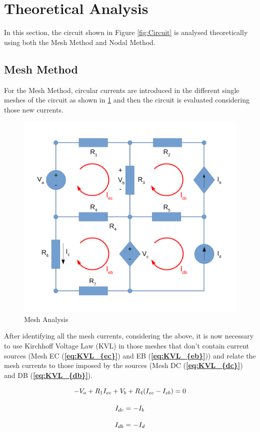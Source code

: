 \section{Theoretical Analysis}

In this section, the circuit shown in Figure \ref{fig:Circuit} is analysed
theoretically using both the Mesh Method and Nodal Method.

\label{sec:analysis}
\subsection {{Mesh Method}}
For the Mesh Method, circular currents are introduced in the different single meshes of the circuit as shown in \ref{fig:MeshAnalysis} and then the circuit is evaluated considering those new currents.

\begin{figure}[h] \centering
\includegraphics[width=0.4\linewidth]{MeshAnalysis.pdf}
\caption{Mesh Analysis}
\label{fig:MeshAnalysis}
\end{figure}

After identifying all the mesh currents, considering the above, it is now necessary to use Kirchhoff Voltage Law (KVL) in those meshes that don't contain current sources (Mesh EC (\textbf{\ref{eq:KVL_{ec}}}) and EB (\textbf{\ref{eq:KVL_{eb}}})) and relate the mesh currents to those imposed by the sources (Mesh DC (\textbf{\ref{eq:KVL_{dc}}}) and DB (\textbf{\ref{eq:KVL_{db}}}).

\vspace{0.1cm}

\begin{equation}
 -V_{a} + R_{1} I_{ec} + V_{b} + R_{4} (I_{ec} - I_{eb}) = 0
 \label{eq:KVL_{ec}}
\end{equation}

\begin{equation}
    I_{dc} = -I_{b}
    \label{eq:KVL_{dc}}
\end{equation}

\begin{equation}
     I_{db} = -I_{d}
     \label{eq:KVL_{db}}
\end{equation}

